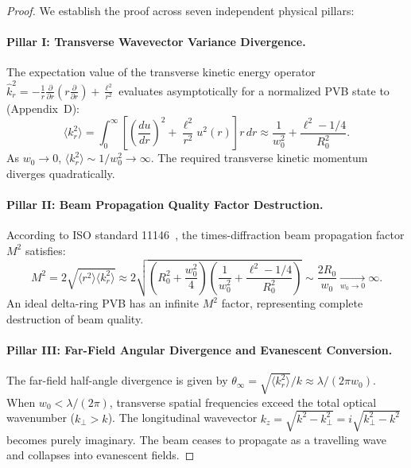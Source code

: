 \documentclass[11pt,a4paper]{article}
\begin{document}
\begin{proof}
We establish the proof across seven independent physical pillars:

\paragraph{Pillar I: Transverse Wavevector Variance Divergence.}
The expectation value of the transverse kinetic energy operator $\hat{k}_r^2 = -\frac{1}{r}\frac{\partial}{\partial r}\left(r \frac{\partial}{\partial r}\right) + \frac{\ell^2}{r^2}$ evaluates asymptotically for a normalized PVB state to (Appendix~D):
\begin{equation}
\langle k_r^2 \rangle = \int_0^\infty \left[ \left(\frac{du}{dr}\right)^2 + \frac{\ell^2}{r^2} u^2(r) \right] r \, dr \approx \frac{1}{w_0^2} + \frac{\ell^2 - 1/4}{R_0^2}.
\end{equation}
As $w_0 \to 0$, $\langle k_r^2 \rangle \sim 1/w_0^2 \to \infty$. The required transverse kinetic momentum diverges quadratically.

\paragraph{Pillar II: Beam Propagation Quality Factor Destruction.}
According to ISO standard 11146~\cite{ISO11146}, the times-diffraction beam propagation factor $M^2$ satisfies:
\begin{equation}
M^2 = 2 \sqrt{\langle r^2 \rangle \langle k_r^2 \rangle} \approx 2 \sqrt{\left(R_0^2 + \frac{w_0^2}{4}\right)\left(\frac{1}{w_0^2} + \frac{\ell^2 - 1/4}{R_0^2}\right)} \sim \frac{2 R_0}{w_0} \xrightarrow[w_0 \to 0]{} \infty.
\end{equation}
An ideal delta-ring PVB has an infinite $M^2$ factor, representing complete destruction of beam quality.

\paragraph{Pillar III: Far-Field Angular Divergence and Evanescent Conversion.}
The far-field half-angle divergence is given by $\theta_\infty = \sqrt{\langle k_r^2 \rangle} / k \approx \lambda / (2\pi w_0)$. When $w_0 < \lambda / (2\pi)$, transverse spatial frequencies exceed the total optical wavenumber ($k_\perp > k$). The longitudinal wavevector $k_z = \sqrt{k^2 - k_\perp^2} = i \sqrt{k_\perp^2 - k^2}$ becomes purely imaginary. The beam ceases to propagate as a travelling wave and collapses into evanescent fields.


\end{proof}
\end{document}
